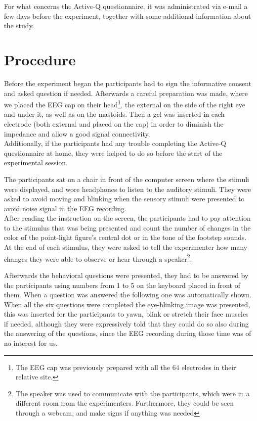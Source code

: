 For what concerns the Active-Q questionnaire, it was administrated via e-mail a few days before the experiment, together with some additional information about the study.

\section{Procedure}
Before the experiment began the participants had to sign the informative consent and asked question if needed. Afterwards a careful preparation was made, where we placed the EEG cap on their head\footnote{The EEG cap was previously prepared with all the 64 electrodes in their relative site.}, the external on the side of the right eye and under it, as well as on the mastoids. Then a gel was inserted in each electrode (both external and placed on the cap) in order to diminish the impedance and allow a good signal connectivity. \\
Additionally, if the participants had any trouble completing the Active-Q questionnaire at home, they were helped to do so before the start of the experimental session. 

The participants sat on a chair in front of the computer screen where the stimuli were displayed, and wore headphones to listen to the auditory stimuli. They were asked to avoid moving and blinking when the sensory stimuli were presented to avoid noise signal in the EEG recording. \\
After reading the instruction on the screen, the participants had to pay attention to the stimulus that was being presented and count the number of changes in the color of the point-light figure's central dot or in the tone of the footstep sounds. At the end of each stimulus, they were asked to tell the experimenter how many changes they were able to observe or hear through a speaker\footnote{The speaker was used to communicate with the participants, which were in a different room from the experimenters. Furthermore, they could be seen through a webcam, and make signs if anything was needed}. 

Afterwards the behavioral questions were presented, they had to be answered by the participants using numbers from 1 to 5 on the keyboard placed in front of them. When a question was answered the following one was automatically shown. When all the six questions were completed the eye-blinking image was presented, this was inserted for the participants to yawn, blink or stretch their face muscles if needed, although they were expressively told that they could do so also during the answering of the questions, since the EEG recording during those time was of no interest for us.  

